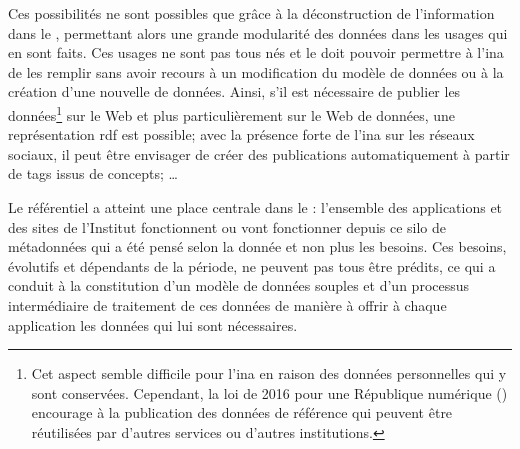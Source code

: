 Ces possibilités ne sont possibles que grâce à la déconstruction de l'information dans le \ldd, permettant alors une grande modularité des données dans les usages qui en sont faits. Ces usages ne sont pas tous nés et le \ldd doit pouvoir permettre à l'\ac{ina} de les remplir sans avoir recours à un modification du modèle de données ou à la création d'une nouvelle de données. Ainsi, s'il est nécessaire de publier les données\footnote{Cet aspect semble difficile pour l'\ac{ina} en raison des données personnelles qui y sont conservées. Cependant, la loi de 2016 pour une République numérique (\cite{noauthor_loi_2016}) encourage à la publication des données de référence qui peuvent être réutilisées par d'autres services ou d'autres institutions.} sur le Web et plus particulièrement sur le Web de données, une représentation \ac{rdf} est possible; avec la présence forte de l'\ac{ina} sur les réseaux sociaux, il peut être envisager de créer des publications automatiquement à partir de tags issus de concepts; \dots

\bigskip
\bigskip
Le référentiel a atteint une place centrale dans le \ldd: l'ensemble des applications et des sites de l'Institut fonctionnent ou vont fonctionner depuis ce silo de métadonnées qui a été pensé selon la donnée et non plus les besoins. Ces besoins, évolutifs et dépendants de la période, ne peuvent pas tous être prédits, ce qui a conduit à la constitution d'un modèle de données souples et d'un processus intermédiaire de traitement de ces données de manière à offrir à chaque application les données qui lui sont nécessaires.